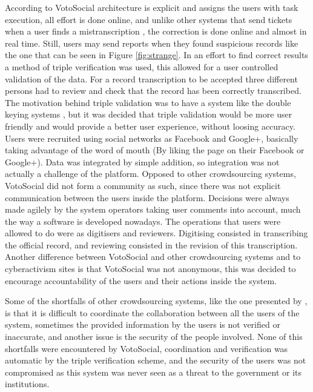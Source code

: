 \documentclass[letterpaper,10pt]{article}
\begin{document}
According to \cite{doan2011} VotoSocial architecture is explicit and assigns the users with task execution, all effort is done online, and unlike other systems that send tickets when a user finds a mistranscription \citep{haaf2013}, the correction is done online and almost in real time. Still, users may send reports when they found suspicious records like the one that can be seen in Figure \ref{fig:strange}. In an effort to find correct results a method of triple verification was used, this allowed for a user controlled validation of the data. For a record transcription to be accepted three different persons had to review and check that the record has been correctly transcribed. The motivation behind triple validation was to have a system like the double keying systems \citep{haaf2013}, but it was decided that triple validation would be more user friendly and would provide a better user experience, without loosing accuracy. Users were recruited using social networks as Facebook and Google+, basically taking advantage of the word of mouth (By liking the page on their Facebook or Google+). Data was integrated by simple addition, so integration was not actually a challenge of the platform. Opposed to other crowdsourcing systems, VotoSocial did not form a community as such, since there was not explicit communication between the users inside the platform. Decisions were always made agilely by the system operators taking user comments into account, much the way a software is developed nowadays. The operations that users were allowed to do were as digitisers and reviewers. Digitising consisted in transcribing the official record, and reviewing consisted in the revision of this transcription. Another difference between VotoSocial and other crowdsourcing systems and to cyberactivism sites is that VotoSocial was not anonymous, this was decided to encourage accountability of the users and their actions inside the system. 

Some of the shortfalls of other crowdsourcing systems, like the one presented by \cite{gao2011}, is that it is difficult to coordinate the collaboration between all the users of the system, sometimes the provided information by the users is not verified or inaccurate, and another issue is the security of the people involved. None of this shortfalls were encountered by VotoSocial, coordination and verification was automatic by the triple verification scheme, and the security of the users was not compromised as this system was never seen as a threat to the government or its institutions.
\end{document}
